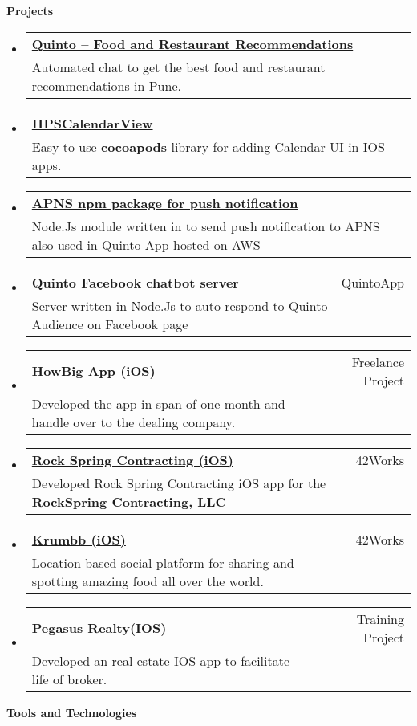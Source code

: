\documentclass[letterpaper,11pt]{article}
\makeatletter
\newcommand{\resheading}[1]{{\large \colorbox{mygrey}{\begin{minipage}{\textwidth}{\textbf{#1 \vphantom{p\^{E}}}}\end{minipage}}}}
\newcommand{\ressubheading}[3]{
	\begin{tabular*}{6.5in}{l@{\extracolsep{\fill}}r}
			\textbf{#1} & #2\\
			{#3} \\
	\end{tabular*}\vspace{-6pt}
}
\makeatother
\begin{document}
\vspace{5mm} 
\resheading{Projects}
	\begin{itemize}
    \item 
			\ressubheading{\href{https://itunes.apple.com/in/app/quinto-discover-best-food/id912305961?mt=8}{Quinto – Food and Restaurant Recommendations}}{}{Automated chat to get the best food and restaurant recommendations in Pune.}
		\item 
			\ressubheading{\href{https://github.com/harry1064/HPSCalendarView}{HPSCalendarView}}{}{Easy to use \href{https://github.com/harry1064/HPSCalendarView}{\textbf{cocoapods}} library for adding Calendar UI in  IOS apps.}
		\item
			\ressubheading{\href{https://www.npmjs.com/package/apns-http2}{APNS npm package for push notification}}{}{Node.Js module written in  to send push notification to APNS also used in  Quinto App hosted on AWS}
		\item
			\ressubheading{Quinto Facebook chatbot server}{QuintoApp}{Server written in Node.Js to auto-respond to Quinto Audience on Facebook page}	
		\item
			\ressubheading{\href{https://itunes.apple.com/in/app/howbig-app/id982763195?mt=8}{HowBig App (iOS)}}{Freelance Project}{Developed the app in span of one month and handle over to the dealing company.}	
	   \item
			\ressubheading{\href{https://itunes.apple.com/in/app/rock-spring-contracting/id1026561788?mt=8}{Rock Spring Contracting (iOS)}}{42Works}{Developed Rock Spring Contracting iOS app for the {\href{http://www.rockspringcontracting.com/}{\textbf{RockSpring Contracting, LLC }}}}                                            \item
			\ressubheading{\href{https://itunes.apple.com/nz/app/krumbb/id1001546648?mt=8}{Krumbb (iOS)}}{42Works}{Location-based social platform for sharing and spotting amazing food all over the world.}	
		\item
			\ressubheading{\href{https://itunes.apple.com/us/app/pegasus-realty/id948309965?mt=8}{Pegasus Realty(IOS)}}{Training Project}{Developed an real estate IOS app to facilitate life of broker.}
\end{itemize}  %
\vspace{5mm} 
\resheading{\Large Tools and Technologies}
\end{document}
